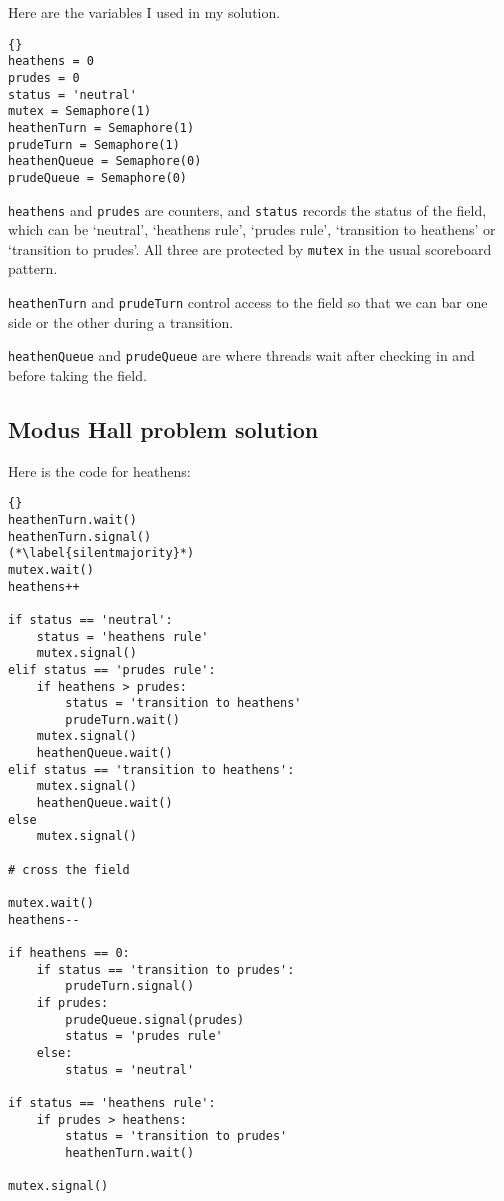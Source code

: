 \documentclass{book}
\newcommand{\clearemptydoublepage}{\newpage\cleardoublepage}
\begin{document}
Here are the variables I used in my solution.

\begin{lstlisting}[title={Modus problem hint}]{}
heathens = 0
prudes = 0
status = 'neutral'
mutex = Semaphore(1)
heathenTurn = Semaphore(1)
prudeTurn = Semaphore(1)
heathenQueue = Semaphore(0)
prudeQueue = Semaphore(0)
\end{lstlisting}

{\tt heathens} and {\tt prudes} are counters, and {\tt status} records
the status of the field, which can be `neutral', `heathens rule',
`prudes rule', `transition to heathens' or `transition to prudes'.
All three are protected by {\tt mutex} in the usual scoreboard
pattern.

{\tt heathenTurn} and {\tt prudeTurn} control access to the field
so that we can bar one side or the other during a transition.

{\tt heathenQueue} and {\tt prudeQueue} are where threads wait after
checking in and before taking the field.


\clearemptydoublepage
\subsection {Modus Hall problem solution}

Here is the code for heathens:

\begin{lstlisting}[title={Modus problem solution}]{}
heathenTurn.wait()
heathenTurn.signal()
(*\label{silentmajority}*)
mutex.wait()
heathens++

if status == 'neutral':
    status = 'heathens rule'
    mutex.signal()
elif status == 'prudes rule':
    if heathens > prudes:
        status = 'transition to heathens'
        prudeTurn.wait()
    mutex.signal()
    heathenQueue.wait()
elif status == 'transition to heathens':
    mutex.signal()
    heathenQueue.wait()
else
    mutex.signal()

# cross the field

mutex.wait()
heathens--

if heathens == 0:
    if status == 'transition to prudes':
        prudeTurn.signal()
    if prudes:
        prudeQueue.signal(prudes)
        status = 'prudes rule'
    else:
        status = 'neutral'
        
if status == 'heathens rule':
    if prudes > heathens:
        status = 'transition to prudes'
        heathenTurn.wait()

mutex.signal()
\end{lstlisting}
\end{document}
